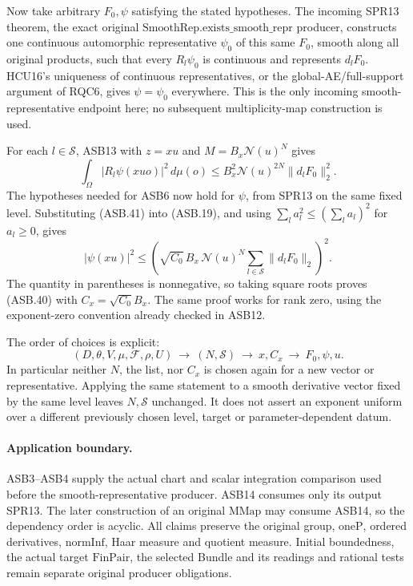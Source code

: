 Now take arbitrary \(F_0,\psi\) satisfying the stated hypotheses.
The incoming SPR13 theorem, the exact original
\(\mathrm{SmoothRep.exists\_smooth\_repr}\) producer, constructs
one continuous automorphic representative \(\psi_0\) of this
same \(F_0\), smooth along all original products, such that
every \(R_l\psi_0\) is continuous and represents \(d_lF_0\).
HCU16's uniqueness of continuous representatives, or the
global-AE/full-support argument of RQC6, gives
\(\psi=\psi_0\) everywhere.
This is the only incoming smooth-representative endpoint here;
no subsequent multiplicity-map construction is used.

For each \(l\in\mathcal S\), ASB13 with \(z=xu\) and
\(M=B_x\mathcal N(u)^N\) gives
\[
       \int_\Omega|R_l\psi(xuo)|^2\,d\mu(o)
           \le B_x^2\mathcal N(u)^{2N}\|d_lF_0\|_2^2.
 \tag{ASB.41}
\]
The hypotheses needed for ASB6 now hold for \(\psi\), from
SPR13 on the same fixed level.  Substituting (ASB.41) into
(ASB.19), and using
\(\sum_l a_l^2\le(\sum_l a_l)^2\) for \(a_l\ge0\), gives
\[
 |\psi(xu)|^2
 \le\left(\sqrt{C_0}\,B_x\,\mathcal N(u)^N
                           \sum_{l\in\mathcal S}\|d_lF_0\|_2\right)^2.
 \tag{ASB.42}
\]
The quantity in parentheses is nonnegative, so taking square
roots proves (ASB.40) with \(C_x=\sqrt{C_0}B_x\).
The same proof works for rank zero, using the exponent-zero
convention already checked in ASB12.

The order of choices is explicit:
\[
       (D,\theta,V,\mu,\mathcal F,\rho,U)
       \ \longrightarrow\ (N,\mathcal S)\
       \longrightarrow\ x,C_x\
       \longrightarrow\ F_0,\psi,u.
 \tag{ASB.43}
\]
In particular neither \(N\), the list, nor \(C_x\) is chosen
again for a new vector or representative.  Applying the same
statement to a smooth derivative vector fixed by the same
level leaves \(N,\mathcal S\) unchanged.
It does not assert an exponent uniform over a different
previously chosen level, target or parameter-dependent datum.

\paragraph{Application boundary.}
ASB3--ASB4 supply the actual chart and scalar integration
comparison used before the smooth-representative producer.
ASB14 consumes only its output SPR13.  The later construction
of an original \(\mathrm{MMap}\) may consume ASB14, so the
dependency order is acyclic.
All claims preserve the original group, \(\mathrm{oneP}\),
ordered derivatives, \(\mathrm{normInf}\), Haar measure and
quotient measure.  Initial boundedness, the actual target
\(\mathrm{FinPair}\), the selected Bundle and its readings
and rational tests remain separate original producer obligations.

